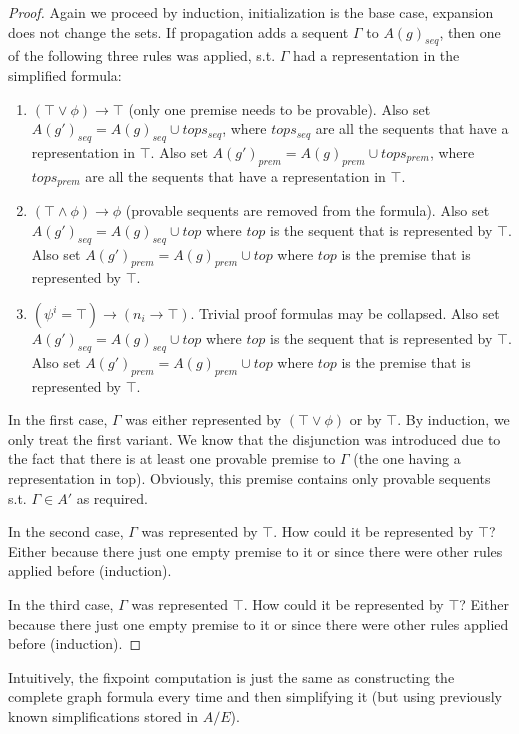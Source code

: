 \documentclass{llncs}
\begin{document}
\begin{lemma}
\begin{proof}
Again we proceed by induction, initialization is the base case, expansion does not change the sets.
If propagation adds a sequent $\Gamma$ to $A(g)_{seq}$, then one of the following three rules was applied,
s.t. $\Gamma$ had a representation in the simplified formula:

\begin{enumerate}
\item $(\top\vee\phi)\rightarrow\top$ (only one premise needs to be provable). Also set $A(g')_{seq}=A(g)_{seq}\cup tops_{seq}$,
where $tops_{seq}$ are all the sequents that have a representation in $\top$. Also set $A(g')_{prem}=A(g)_{prem}\cup tops_{prem}$,
where $tops_{prem}$ are all the sequents that have a representation in $\top$.
\item $(\top\wedge\phi)\rightarrow\phi$ (provable sequents are removed from the formula). Also set $A(g')_{seq}=A(g)_{seq}\cup top$ where $top$
is the sequent that is represented by $\top$. Also set $A(g')_{prem}=A(g)_{prem}\cup top$ where $top$
is the premise that is represented by $\top$.
\item $(\psi^i=\top) \rightarrow (n_i \rightarrow \top)$. Trivial proof formulas may be collapsed. Also set $A(g')_{seq}=A(g)_{seq}\cup top$ where
$top$ is the sequent that is represented by $\top$. Also set $A(g')_{prem}=A(g)_{prem}\cup top$ where
$top$ is the premise that is represented by $\top$.
\end{enumerate}

In the first case, $\Gamma$ was either represented by $(\top\vee\phi)$ or by $\top$. By induction, we only treat the first variant.
We know that the disjunction was introduced due to the fact that there is at least one provable premise to $\Gamma$ (the one having a
representation in top). Obviously, this premise contains only provable sequents s.t. $\Gamma\in A'$ as required.

In the second case, $\Gamma$ was represented by $\top$. How could it be represented by $\top$? Either because there just one empty premise to it
or since there were other rules applied before (induction).

In the third case, $\Gamma$ was represented $\top$. How could it be represented by $\top$? Either because there just one empty premise to it
or since there were other rules applied before (induction).
\end{proof}
\end{lemma}

Intuitively, the fixpoint computation is just the same as constructing the complete
graph formula every time and then simplifying it (but using previously known simplifications stored in $A/E$).
\end{document}
